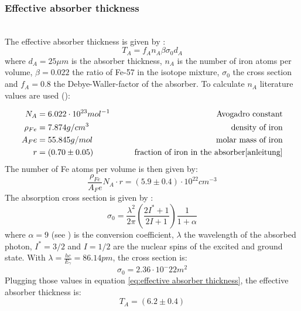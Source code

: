 \subsubsection{Effective absorber thickness} \ \\
The effective absorber thickness is given by \cite{anleitung}:
\begin{equation}
T_A = f_An_A\beta\sigma_0d_A
\label{eq:effective absorber thickness}
\end{equation}
where $d_A = 25\mu m$ is the absorber thickness, $n_A$ is the number of iron atoms per volume, $\beta=0.022$ the ratio of Fe-57 in the isotope mixture, $\sigma_0$ the cross section and $f_A=0.8$ the Debye-Waller-factor of the absorber.
To calculate $n_A$ literature values are used (\cite{webelements}):

\begin{equation*}
\begin{aligned}
N_A &= 6.022 \cdot 10^{23} mol^{-1} \qquad& \text{Avogadro constant}\\
\rho_{Fe} &= 7.874 g/cm^3 \qquad& \text{density of iron} \\
A_Fe &= 55.845 g/mol \qquad& \text{molar mass of iron}\\
r &=  (0.70\pm0.05) \qquad& \text{fraction of iron in the absorber\cite{anleitung}}
\end{aligned}
\end{equation*}
The number of Fe atoms per volume is then given by:
\begin{equation*}
\frac{\rho_{Fe}}{A_Fe}N_A\cdot r= (5.9\pm0.4)\cdot 10^{22} cm^{-3}
\end{equation*}
The absorption cross section is given by \cite{Wegener}:
\begin{equation}
\sigma_0= \frac{\lambda^2}{2\pi} \left(\frac{2I^*+1}{2I+1}\right) \frac{1}{1+\alpha}
\end{equation}
where $\alpha =9$ (see \cite{Wegener}) is the conversion coefficient, $\lambda$ the wavelength of the absorbed photon, $I^*=3/2$ and $I=1/2$  are the nuclear spins of the excited and ground state. With $\lambda = \frac{hc}{E_\gamma}=86.14 pm$, the cross section is:
\begin{equation}
\sigma_0=2.36\cdot 10^-22m^2
\end{equation}
Plugging those values in equation \ref{eq:effective absorber thickness}, the effective absorber thickness is:
\begin{equation}
T_A = (6.2\pm 0.4)
\end{equation}
